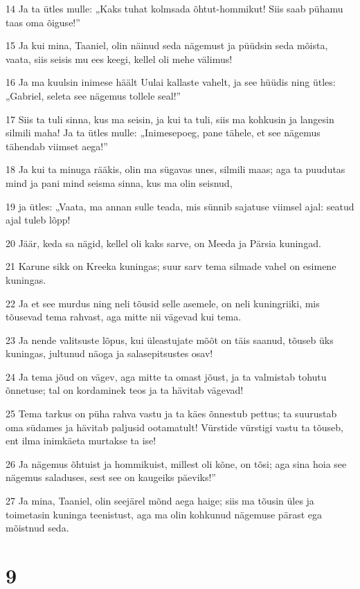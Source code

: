\par 14 Ja ta ütles mulle: „Kaks tuhat kolmsada õhtut-hommikut! Siis saab pühamu taas oma õiguse!”
\par 15 Ja kui mina, Taaniel, olin näinud seda nägemust ja püüdsin seda mõista, vaata, siis seisis mu ees keegi, kellel oli mehe välimus!
\par 16 Ja ma kuulsin inimese häält Uulai kallaste vahelt, ja see hüüdis ning ütles: „Gabriel, seleta see nägemus tollele seal!”
\par 17 Siis ta tuli sinna, kus ma seisin, ja kui ta tuli, siis ma kohkusin ja langesin silmili maha! Ja ta ütles mulle: „Inimesepoeg, pane tähele, et see nägemus tähendab viimset aega!”
\par 18 Ja kui ta minuga rääkis, olin ma sügavas unes, silmili maas; aga ta puudutas mind ja pani mind seisma sinna, kus ma olin seisnud,
\par 19 ja ütles: „Vaata, ma annan sulle teada, mis sünnib sajatuse viimsel ajal: seatud ajal tuleb lõpp!
\par 20 Jäär, keda sa nägid, kellel oli kaks sarve, on Meeda ja Pärsia kuningad.
\par 21 Karune sikk on Kreeka kuningas; suur sarv tema silmade vahel on esimene kuningas.
\par 22 Ja et see murdus ning neli tõusid selle asemele, on neli kuningriiki, mis tõusevad tema rahvast, aga mitte nii vägevad kui tema.
\par 23 Ja nende valitsuste lõpus, kui üleastujate mõõt on täis saanud, tõuseb üks kuningas, jultunud näoga ja salasepitsustes osav!
\par 24 Ja tema jõud on vägev, aga mitte ta omast jõust, ja ta valmistab tohutu õnnetuse; tal on kordaminek teos ja ta hävitab vägevad!
\par 25 Tema tarkus on püha rahva vastu ja ta käes õnnestub pettus; ta suurustab oma südames ja hävitab paljusid ootamatult! Vürstide vürstigi vastu ta tõuseb, ent ilma inimkäeta murtakse ta ise!
\par 26 Ja nägemus õhtuist ja hommikuist, millest oli kõne, on tõsi; aga sina hoia see nägemus saladuses, sest see on kaugeiks päeviks!”
\par 27 Ja mina, Taaniel, olin seejärel mõnd aega haige; siis ma tõusin üles ja toimetasin kuninga teenistust, aga ma olin kohkunud nägemuse pärast ega mõistnud seda.

\chapter{9}

